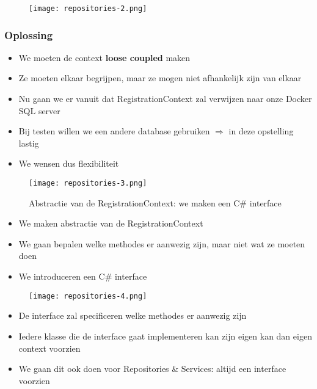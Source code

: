 \documentclass{article}
\begin{document}
\begin{figure}[H]
    \centering
    \texttt{[image: repositories-2.png]}
    \caption{}
\end{figure}


\subsubsection{Oplossing}

\begin{itemize}
    \item We moeten de context \textbf{loose coupled} maken
    \item Ze moeten elkaar begrijpen, maar ze mogen niet afhankelijk zijn van elkaar
    \item Nu gaan we er vanuit dat RegistrationContext zal verwijzen naar onze Docker SQL server
    \item Bij testen willen we een andere database gebruiken $\Rightarrow$ in deze opstelling lastig
    \item We wensen dus flexibiliteit
\end{itemize}

\begin{figure}[H]
    \centering
    \texttt{[image: repositories-3.png]}
    \caption{Abstractie van de RegistrationContext: we maken een C\# interface}
\end{figure}

\begin{itemize}
    \item We maken abstractie van de RegistrationContext
    \item We gaan bepalen welke methodes er aanwezig zijn, maar niet wat ze moeten doen
    \item We introduceren een C\# interface
\end{itemize}

\begin{figure}[H]
    \centering
    \texttt{[image: repositories-4.png]}
    \caption{}
\end{figure}

\begin{itemize}
    \item De interface zal specificeren welke methodes er aanwezig zijn
    \item Iedere klasse die de interface gaat implementeren kan zijn eigen kan dan eigen context voorzien
    \item We gaan dit ook doen voor Repositories \& Services: altijd een interface voorzien
\end{itemize}
\end{document}
